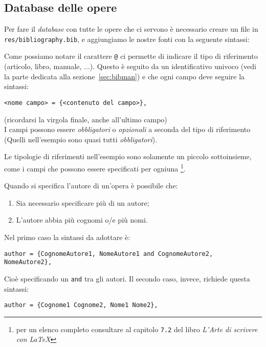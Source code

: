 \subsection{Database delle opere}
Per fare il \textit{database} con tutte le opere che ci servono è necessario
creare un file in \texttt{res/bibliography.bib}, e aggiungiamo le nostre fonti
con la seguente sintassi:

Come possiamo notare il carattere \verb!@! ci permette di indicare il tipo di 
riferimento (articolo, libro, manuale, ...). Questo è seguito da un 
identificativo univoco (vedi la parte dedicata alla sezione~\ref{sec:bibman}) 
e che ogni campo deve seguire la sintassi:
\begin{lstlisting}
<nome campo> = {<contenuto del campo>},
\end{lstlisting}
(ricordarsi la virgola finale, anche all'ultimo campo)\\
I campi possono essere \emph{obbligatori} o \emph{opzionali} a seconda del 
tipo di riferimento (Quelli nell'esempio sono quasi tutti \emph{obbligatori}).
\par Le tipologie di riferimenti nell'esempio sono solamente un piccolo 
sottoinsieme, come i campi che possono essere specificati per ogniuna
\footnote{per un elenco completo consultare al capitolo \texttt{7.2} del libro 
\textit{L'Arte di scrivere con \LaTeX{}}}.
\par Quando si specifica l'autore di un'opera è possibile che:
\begin{enumerate}
    \item Sia necessario specificare più di un autore;
    \item L'autore abbia più cognomi o/e più nomi.
\end{enumerate}
Nel primo caso la sintassi da adottare è:
\begin{lstlisting}
author = {CognomeAutore1, NomeAutore1 and CognomeAutore2, NomeAutore2},
\end{lstlisting}
Cioè specificando un \texttt{and} tra gli autori. Il secondo caso, invece, 
richiede questa sintassi:
\begin{lstlisting}
author = {Cognome1 Cognome2, Nome1 Nome2},
\end{lstlisting}

